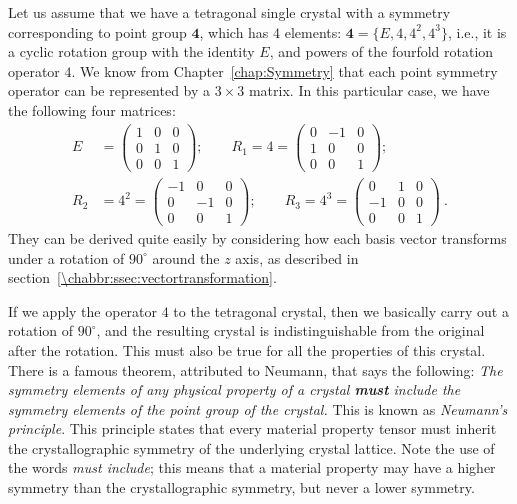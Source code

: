Let us assume that we have a tetragonal single crystal with a symmetry corresponding to point group $\textbf{4}$, which has $4$ elements: $\textbf{4} = \{E,4,4^2,4^3\}$, i.e., it is a cyclic rotation group with the identity $E$, and powers of the fourfold rotation operator $4$. We know from Chapter~\ref{chap:Symmetry} that each point symmetry operator can be represented by a $3\times 3$ matrix.  In this particular case, we have the following four matrices:
\begin{align}
E &= \begin{pmatrix}1&0&0\\ 0&1&0\\ 0&0&1\end{pmatrix}; \qquad R_1 = 4 = \begin{pmatrix}0&-1&0\\ 1&0&0\\ 0&0&1\end{pmatrix};\nonumber\\
R_2 &= 4^2= \begin{pmatrix}-1&0&0\\ 0&-1&0\\ 0&0&1\end{pmatrix}; \qquad R_3 = 4^3 = \begin{pmatrix}0&1&0\\ -1&0&0\\ 0&0&1\end{pmatrix}\ .
\end{align}
They can be derived quite easily by considering how each basis vector transforms under a rotation of $90^{\circ}$ around the $z$ axis, as described in section~\ref{\chabbr:ssec:vectortransformation}.

If we apply the operator $4$ to the tetragonal crystal, then we basically carry out a rotation of $90^{\circ}$, and the resulting crystal is indistinguishable from the original after the rotation.  This must also be true for all the properties of this crystal.  There is a famous theorem, attributed to Neumann, that says the following:  \textit{The symmetry elements of any physical property of a crystal \textbf{must} include the symmetry elements of the point group of the crystal.}  This is known as \textit{Neumann's principle}.   This principle states that every material property tensor must inherit the crystallographic symmetry of the underlying crystal lattice.  Note the use of the words \textit{must include}; this means that a material property may have a higher symmetry than the crystallographic symmetry, but never a lower symmetry.

